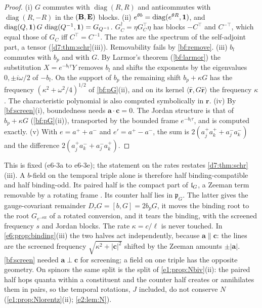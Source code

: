 \begin{proof}
(i) $G$ commutes with $\operatorname{diag}(R,R)$ and anticommutes with $\operatorname{diag}(R,-R)$ in the $(\mathbf B,\mathbf E)$ blocks. (ii)
$e^{\theta b}=\operatorname{diag}(e^{\theta R},\mathbf 1)$, and $\operatorname{diag}(Q,\mathbf 1)\,G\,\operatorname{diag}(Q^{-1},\mathbf 1)=G_{Q^{-1}}$. $G_C^\dagger=\eta G_C^{\!\top}\eta$ has blocks $-C^{\!\top}$ and
$C^{-\top}$, which equal those of $G_C$ iff $C^{\!\top}=C^{-1}$. The rates are the spectrum of the self-adjoint part, a tensor (\cref{d7:thm:schr}(iii)). Removability fails by \cref{bf:remove}. (iii) $b_l$ commutes with $b_p$ and with $G$. By Larmor's theorem (\cref{bf:larmor}) the substitution $X=e^{-b_l\tau}Y$ removes $b_l$ and shifts the exponents by the eigenvalues $0,\pm i\omega/2$ of $-b_l$. On the support of $b_p$ the
remaining shift $b_p+\kappa G$ has the frequency $(\kappa^2+\omega^2/4)^{1/2}$ of \cref{bf:pG}(ii), and on its kernel $\langle\hat{\mathbf r},G\hat{\mathbf r}\rangle$ the
frequency $\kappa$. The characteristic polynomial is also computed symbolically in $\mathbf r$. (iv) By \cref{bf:screen}(i), boundedness needs
$\mathbf a\cdot\mathbf c=0$. The Jordan structure is that of $b_p+\kappa G$ (\cref{bf:pG}(ii)), transported by the bounded frame $e^{-b_l\tau}$, and is
computed exactly. (v) With $e=a^++a^-$ and $e'=a^+-a^-$, the sum is $2(a^+_ja^+_k+a^-_ja^-_k)$ and the difference $2(a^+_ja^-_k+a^-_ja^+_k)$.
\end{proof}

This is fixed (e6-3a to e6-3e); the statement on the rates restates \cref{d7:thm:schr}(iii). A $b$-field on the temporal triple alone is
therefore half binding-compatible and half binding-odd. Its paired half is the compact part of $\mathfrak l_G$, a Zeeman term removable by a rotating frame
\cite{Larmor1897}. Its counter half lies in $\mathfrak p_G$. The latter gives the gauge-covariant remainder $D_\tau G=[b,G]=2b_pG$, it moves the binding root
to the root $G_{e^{-\theta R}}$ of a rotated conversion, and it tears the binding, with the screened frequency $s$ and Jordan blocks. The rate
$\kappa=c/\ell$ is never touched. In \cref{e6:prop:binding}(iii) the two halves act independently, because $\mathbf a\parallel\mathbf c$: the lines are
the screened frequency $\sqrt{\kappa^2+|\mathbf c|^2}$ shifted by the Zeeman amounts $\pm|\mathbf a|$. \cref{bf:screen} needed
$\mathbf a\perp\mathbf c$ for screening; a field on one triple has the opposite geometry. On spinors the same split is the split of
\cref{e1:prop:Nbiv}(ii): the paired half hops quanta within a constituent and the counter half creates or annihilates them in pairs, so the
temporal rotations, $J$ included, do not conserve $N$ (\cref{e1:prop:Nlorentz}(ii); \cref{e2:lem:N}).

